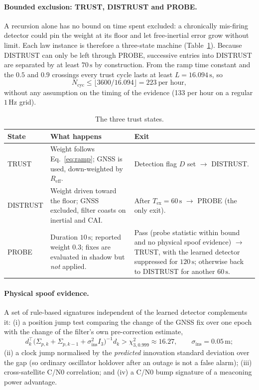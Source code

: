 \documentclass[12pt,a4paper]{article}
\begin{document}
\paragraph{Bounded exclusion: TRUST, DISTRUST and PROBE.}
A recursion alone has no bound on time spent excluded: a chronically mis-firing detector could pin the weight at its floor and let free-inertial error grow without limit. Each law instance is therefore a three-state machine (Table~\ref{tab:states}). Because DISTRUST can only be left through PROBE, successive entries into DISTRUST are separated by at least $70\,\mathrm{s}$ by construction. From the ramp time constant and the $0.5$ and $0.9$ crossings every trust cycle lasts at least $L=16.094\,\mathrm{s}$, so
\begin{equation}
N_{\mathrm{cyc}} \le \lfloor 3600/16.094\rfloor = 223\ \text{per hour},
\end{equation}
without any assumption on the timing of the evidence (133 per hour on a regular $1\,\mathrm{Hz}$ grid).

\begin{table}[ht]
\centering
\caption{The three trust states.}
\label{tab:states}
\small
\begin{tabular}{p{2.2cm}p{4.2cm}p{7.2cm}}
\toprule
State & What happens & Exit \\
\midrule
TRUST & Weight follows Eq.~\eqref{eq:ramp}; GNSS is used, down-weighted by $R_{\mathrm{eff}}$. & Detection flag $D$ set $\rightarrow$ DISTRUST. \\
DISTRUST & Weight driven toward the floor; GNSS excluded, filter coasts on inertial and CAI. & After $T_{\mathrm{ex}}=60\,\mathrm{s}$ $\rightarrow$ PROBE (the only exit). \\
PROBE & Duration $10\,\mathrm{s}$; reported weight $0.3$; fixes are evaluated in shadow but \emph{not} applied. & Pass (probe statistic within bound and no physical spoof evidence) $\rightarrow$ TRUST, with the learned detector suppressed for $120\,\mathrm{s}$; otherwise back to DISTRUST for another $60\,\mathrm{s}$. \\
\bottomrule
\end{tabular}
\end{table}

\paragraph{Physical spoof evidence.}
A set of rule-based signatures independent of the learned detector complements it: (i) a position jump test comparing the change of the GNSS fix over one epoch with the change of the filter's own pre-correction estimate,
\begin{equation}
d_k^{\top}\big(\Sigma_{p,k}+\Sigma_{p,k-1}+\sigma_{\mathrm{ins}}^2I_3\big)^{-1}d_k > \chi^2_{3,0.999}\approx16.27,\qquad\sigma_{\mathrm{ins}}=0.05\,\mathrm{m};
\label{eq:jump}
\end{equation}
(ii) a clock jump normalised by the \emph{predicted} innovation standard deviation over the gap (so ordinary oscillator holdover after an outage is not a false alarm); (iii) cross-satellite C/N0 correlation; and (iv) a C/N0 bump signature of a meaconing power advantage.
\end{document}
